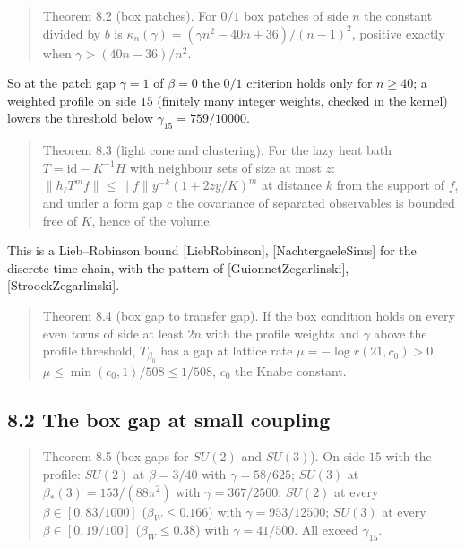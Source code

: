 \documentclass[10pt,letterpaper,twocolumn]{article}
\begin{document}
\begin{quote}
Theorem 8.2 (box patches). For \(0/1\) box patches of side \(n\) the constant divided by \(b\) is \(\kappa_n(\gamma)=(\gamma n^2-40n+36)/(n-1)^2\), positive exactly when \(\gamma>(40n-36)/n^2\).
\end{quote}

So at the patch gap \(\gamma=1\) of \(\beta=0\) the \(0/1\) criterion holds only for \(n\ge40\); a weighted profile on side \(15\) (finitely many integer weights, checked in the kernel) lowers the threshold below \(\gamma_{15}=759/10000\).

\begin{quote}
Theorem 8.3 (light cone and clustering). For the lazy heat bath \(T=\mathrm{id}-K^{-1}H\) with neighbour sets of size at most \(z\): \(\|h_\ell T^mf\|\le\|f\|y^{-k}(1+2zy/K)^m\) at distance \(k\) from the support of \(f\), and under a form gap \(c\) the covariance of separated observables is bounded free of \(K\), hence of the volume.
\end{quote}

This is a Lieb--Robinson bound {[}LiebRobinson{]}, {[}NachtergaeleSims{]} for the discrete-time chain, with the pattern of {[}GuionnetZegarlinski{]}, {[}StroockZegarlinski{]}.

\begin{quote}
Theorem 8.4 (box gap to transfer gap). If the box condition holds on every even torus of side at least \(2n\) with the profile weights and \(\gamma\) above the profile threshold, \(T_{\beta_0}\) has a gap at lattice rate \(\mu=-\log r(21,c_0)>0\), \(\mu\le\min(c_0,1)/508\le1/508\), \(c_0\) the Knabe constant.
\end{quote}

\subsection{8.2 The box gap at small coupling}\label{82-the-box-gap-at-small-coupling}

\begin{quote}
Theorem 8.5 (box gaps for \(SU(2)\) and \(SU(3)\)). On side \(15\) with the profile: \(SU(2)\) at \(\beta=3/40\) with \(\gamma=58/625\); \(SU(3)\) at \(\beta_\ast(3)=153/(88\pi^2)\) with \(\gamma=367/2500\); \(SU(2)\) at every \(\beta\in[0,83/1000]\) (\(\beta_W\le0.166\)) with \(\gamma=953/12500\); \(SU(3)\) at every \(\beta\in[0,19/100]\) (\(\beta_W\le0.38\)) with \(\gamma=41/500\). All exceed \(\gamma_{15}\).
\end{quote}
\end{document}
